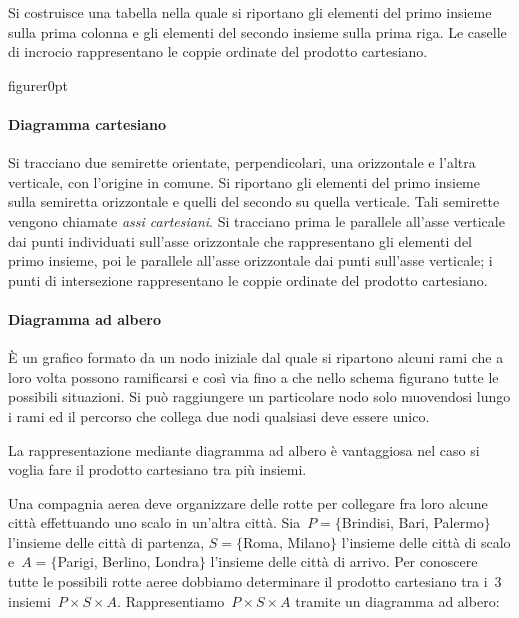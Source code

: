 Si costruisce una tabella nella quale si riportano gli elementi del
primo insieme sulla prima colonna e gli elementi del secondo insieme
sulla prima riga. Le caselle di incrocio rappresentano le coppie
ordinate del prodotto cartesiano.
\begin{center}
 
\end{center}

\begin{wrapfloat}{figure}{r}{0pt}
 
\end{wrapfloat}

\paragraph{Diagramma cartesiano}
Si tracciano due semirette orientate, perpendicolari, una orizzontale e l'altra
verticale, con l'origine
in comune. Si riportano gli elementi del primo insieme sulla semiretta
orizzontale e quelli del secondo su quella verticale. Tali semirette
vengono chiamate \emph{assi cartesiani}. Si tracciano prima le
parallele all'asse verticale dai punti individuati
sull'asse orizzontale che rappresentano gli elementi
del primo insieme, poi le parallele all'asse
orizzontale dai punti sull'asse verticale; i punti di
intersezione rappresentano le coppie ordinate del prodotto
cartesiano.

\paragraph{Diagramma ad albero}
\`E un grafico formato da un nodo iniziale dal quale si ripartono alcuni
rami che a loro volta possono ramificarsi e così via fino a che nello
schema figurano tutte le possibili situazioni.
Si può raggiungere un particolare nodo solo muovendosi lungo i rami ed
il percorso che collega due nodi qualsiasi deve essere unico.

La rappresentazione mediante diagramma ad albero è vantaggiosa nel
caso si voglia fare il prodotto cartesiano tra più insiemi.
\begin{center}

\end{center}

\begin{exrig}
 \begin{esempio}
 Una compagnia aerea deve organizzare delle rotte per collegare fra loro alcune città effettuando uno scalo
in un'altra città. Sia~$P=\{$Brindisi, Bari, Palermo$\}$ l'insieme delle città di
partenza, $S=\{$Roma, Milano$\}$ l'insieme delle città di
scalo e~$A=\{$Parigi, Berlino, Londra$\}$ l'insieme delle città di
arrivo. Per conoscere tutte le possibili rotte aeree dobbiamo
determinare il prodotto cartesiano tra i~3 insiemi~$P\times S\times A$.
Rappresentiamo~$P\times S\times A$ tramite un diagramma ad albero:
\begin{center}

\end{center}
 \end{esempio}
\end{exrig}

